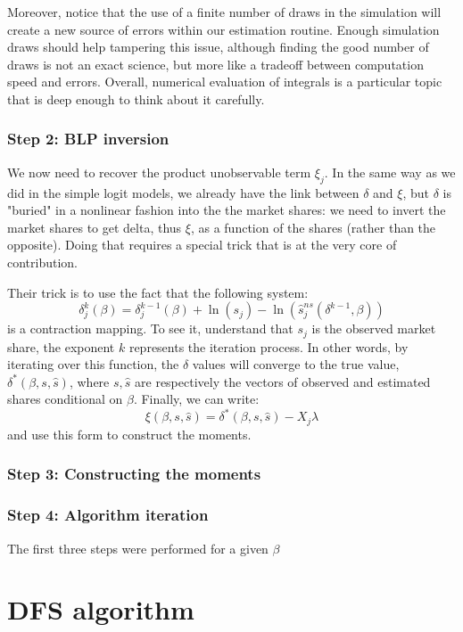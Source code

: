\documentclass[12pt]{report}
\begin{document}
Moreover, notice that the use of a finite number of draws in the simulation will create a new source of errors within our estimation routine. Enough simulation draws should help tampering this issue, although finding the good number of draws is not an exact science, but more like a tradeoff between computation speed and errors. Overall, numerical evaluation of integrals is a particular topic that is deep enough to think about it carefully.

\subsubsection{Step 2: BLP inversion}

We now need to recover the product unobservable term $\xi_j$. In the same way as we did in the simple logit models, we already have the link between $\delta$ and $\xi$, but $\delta$ is "buried" in a nonlinear fashion into the the market shares: we need to invert the market shares to get delta, thus $\xi$, as a function of the shares (rather than the opposite). Doing that requires a special trick that is at the very core of\cite{blp_95} contribution.

Their trick is to use the fact that the following system: $$\delta_j^k(\beta) = \delta_j^{k-1}(\beta) + \ln(s_j) - \ln(\hat s_j^{ns}(\delta^{k-1}, \beta)) $$ is a contraction mapping. To see it, understand that $s_j$ is the observed market share, the exponent $k$ represents the iteration process. In other words, by iterating over this function, the $\delta$ values will converge to the true value, $\delta^*(\beta, s, \hat s)$, where $s, \hat s$ are respectively the vectors of observed and estimated shares conditional on $\beta$. Finally, we can write: $$\xi(\beta, s, \hat s) = \delta^*(\beta, s, \hat s) - X_j\lambda $$ and use this form to construct the moments.

\subsubsection{Step 3: Constructing the moments}



\subsubsection{Step 4: Algorithm iteration}

The first three steps were performed for a given $\beta$ 

\section{DFS algorithm}
\end{document}

